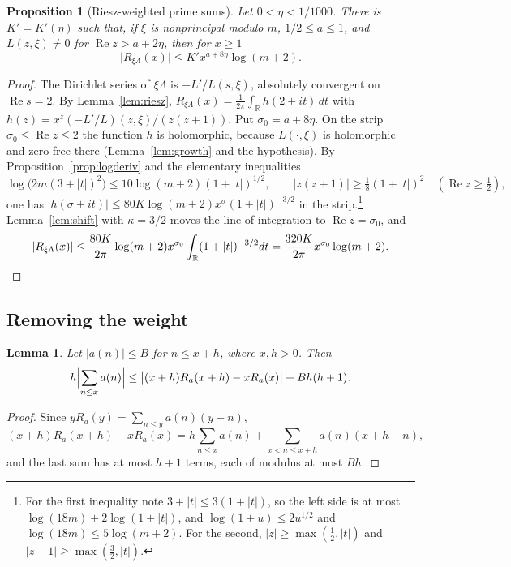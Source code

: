 \documentclass[11pt]{amsart}
\newtheorem{proposition}[theorem]{Proposition}
\newtheorem{lemma}[theorem]{Lemma}
\theoremstyle{definition}
\theoremstyle{remark}
\numberwithin{equation}{section}
\newcommand{\R}{\operatorname{Re}}
\begin{document}
\begin{proposition}[Riesz-weighted prime sums]\label{prop:rieszprime}
Let $0<\eta<1/1000$. There is $K'=K'(\eta)$ such that, if $\xi$ is
nonprincipal modulo $m$, $1/2\le a\le1$, and $L(z,\xi)\ne0$ for $\R z>a+2\eta$,
then for $x\ge1$
\[
\bigl|R_{\xi\Lambda}(x)\bigr|\le K'x^{a+8\eta}\log(m+2).
\]
\end{proposition}

\begin{proof}
The Dirichlet series of $\xi\Lambda$ is $-L'/L(s,\xi)$, absolutely convergent on
$\R s=2$. By Lemma~\ref{lem:riesz},
$R_{\xi\Lambda}(x)=\frac1{2\pi}\int_{\mathbb R}h(2+it)\,dt$ with
$h(z)=x^z(-L'/L)(z,\xi)/(z(z+1))$. Put $\sigma_0=a+8\eta$. On the strip
$\sigma_0\le\R z\le2$ the function $h$ is holomorphic, because $L(\cdot,\xi)$ is
holomorphic and zero-free there (Lemma~\ref{lem:growth} and the hypothesis).
By Proposition~\ref{prop:logderiv} and the elementary inequalities
\[
\log\bigl(2m(3+|t|)^2\bigr)\le10\log(m+2)(1+|t|)^{1/2},\qquad|z(z+1)|\ge\tfrac18(1+|t|)^2\quad(\R z\ge\tfrac12),
\]
one has $|h(\sigma+it)|\le80K\log(m+2)x^\sigma(1+|t|)^{-3/2}$ in the
strip.\footnote{For the first inequality note $3+|t|\le3(1+|t|)$, so the left
side is at most $\log(18m)+2\log(1+|t|)$, and $\log(1+u)\le2u^{1/2}$ and
$\log(18m)\le 5\log(m+2)$. For the second, $|z|\ge\max(\frac12,|t|)$ and
$|z+1|\ge\max(\frac32,|t|)$.} Lemma~\ref{lem:shift} with $\kappa=3/2$ moves the line of
integration to $\R z=\sigma_0$, and
\[
|R_{\xi\Lambda}(x)|\le\frac{80K}{2\pi}\log(m+2)x^{\sigma_0}\int_{\mathbb R}(1+|t|)^{-3/2}dt=\frac{320K}{2\pi}x^{\sigma_0}\log(m+2).\qedhere
\]
\end{proof}

\subsection{Removing the weight}

\begin{lemma}\label{lem:unsmooth}
Let $|a(n)|\le B$ for $n\le x+h$, where $x,h>0$. Then
\[
h\Bigl|\sum_{n\le x}a(n)\Bigr|\le\bigl|(x+h)R_a(x+h)-xR_a(x)\bigr|+Bh(h+1).
\]
\end{lemma}

\begin{proof}
Since $yR_a(y)=\sum_{n\le y}a(n)(y-n)$,
\[
(x+h)R_a(x+h)-xR_a(x)=h\sum_{n\le x}a(n)+\sum_{x<n\le x+h}a(n)(x+h-n),
\]
and the last sum has at most $h+1$ terms, each of modulus at most $Bh$.
\end{proof}
\end{document}
